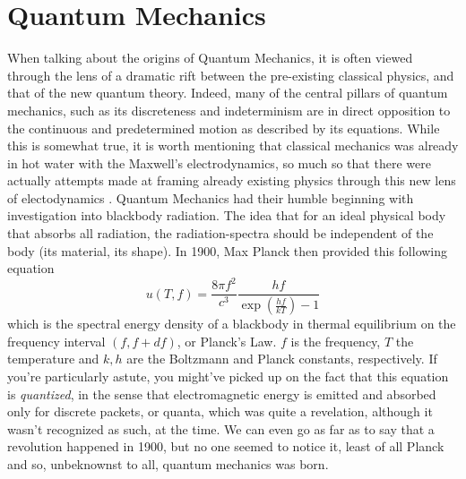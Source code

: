 \documentclass[12pt]{article}
\begin{document}
{\section{Quantum Mechanics}
When talking about the origins of Quantum Mechanics, it is often viewed through the lens of a dramatic rift between the pre-existing classical physics, and that of the new quantum theory. Indeed, many of the central pillars of quantum mechanics, such as its discreteness and indeterminism are in direct opposition to the continuous and predetermined motion as described by its equations. While this is somewhat true, it is worth mentioning that classical mechanics was already in hot water with the Maxwell's electrodynamics, so much so that there were actually attempts made at framing already existing physics through this new lens of electodynamics \cite{qmhistory}. \newline
Quantum Mechanics had their humble beginning with investigation into blackbody radiation. The idea that for an ideal physical body that absorbs all radiation, the radiation-spectra should be independent of the body (its material, its shape). In 1900, Max Planck then provided this following equation
\begin{equation*}
    u(T, f) = \frac{8 \pi f^2}{c^3} \frac{hf}{\exp\left(\frac{hf}{kT}\right)- 1}
\end{equation*}
which is the spectral energy density of a blackbody in thermal equilibrium on the frequency interval $(f, f + df)$, or Planck's Law. $f$ is the frequency, $T$ the temperature and $k, h$ are the Boltzmann and Planck constants, respectively. \newline
If you're particularly astute, you might've picked up on the fact that this equation is \textit{quantized}, in the sense that electromagnetic energy is emitted and absorbed only for discrete packets, or quanta, which was quite a revelation, although it wasn't recognized as such, at the time. We can even go as far as to say that a revolution happened in 1900, but no one seemed to notice it, least of all Planck and so, unbeknownst to all, quantum mechanics was born.
}
\end{document}
